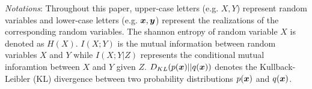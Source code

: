 {\em Notations}: Throughout this paper, upper-case letters (e.g. $X,Y$) represent random variables and lower-case letters (e.g. $\boldsymbol{x},\boldsymbol{y}$) represent the realizations of the corresponding random variables. The shannon entropy of random variable $X$ is denoted as $H(X)$. $I(X;Y)$ is the mutual information between random variables $X$ and $Y$ while $I(X;Y|Z)$ represents the conditional mutual inforamtion between $X$ and $Y$ given $Z$. $D_{KL}(p(\boldsymbol{x})||q(\boldsymbol{x}))$ denotes the Kullback-Leibler (KL) divergence between two probability distributions $p(\boldsymbol{x})$ and $q(\boldsymbol{x})$.

